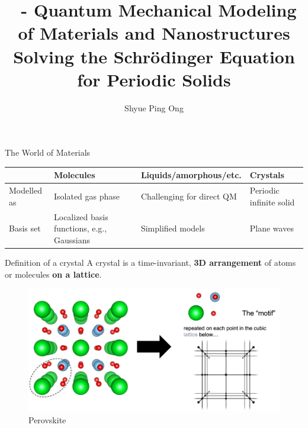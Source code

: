 \documentclass[aspectratio=169]{beamer}
\title[\classname Solving the Schr\"odinger Equation for Periodic Solids]{\classname~- Quantum Mechanical Modeling of Materials and Nanostructures\\Solving the Schr\"odinger Equation for Periodic Solids}
\author{Shyue Ping Ong}
\institute[UCSD]{University of California, San Diego\\
\medskip
}
\date{\classyear} %
\begin{document}
    \begin{frame}
        \titlepage %
    \end{frame}


    \begin{frame}{The World of Materials}

        \begin{table}[]
            \centering
            \begin{tabular}{p{2cm}|p{3cm}|p{4cm}|p{3cm}}
                & Molecules                                  & Liquids/amorphous/etc.    & Crystals                \\
                \hline
                \hline
                Modelled as & Isolated gas phase                         & Challenging for direct QM & Periodic infinite solid \\
                Basis set   & Localized basis functions, e.g., Gaussians & Simplified models         & Plane waves
            \end{tabular}
        \end{table}
    \end{frame}

    \begin{frame}{Definition of a crystal}
        A crystal is a time-invariant, \textbf{3D arrangement} of atoms or molecules \textbf{on a lattice}.

        \begin{figure}
            \centering
            \includegraphics[width=0.6\linewidth]{lectures/figures/7_crystal.png}
            \caption{Perovskite }
        \end{figure}

    \end{frame}
\end{document}
